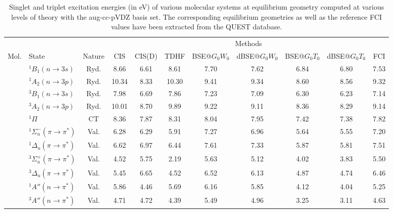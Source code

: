 \documentclass[aip,jcp,reprint,noshowkeys,superscriptaddress]{revtex4-1}
\newcommand{\mc}{\multicolumn}
\newcommand{\pps}{\pi \to \pi^*}
\newcommand{\nps}{n \to \pi^*}
\begin{document}
\begin{table}
	\caption{Singlet and triplet excitation energies (in \si{\eV}) of various molecular systems at equilibrium geometry computed at various levels of theory with the aug-cc-pVDZ basis set.
	The corresponding equilibrium geometries as well as the reference FCI values have been extracted from the QUEST database. \cite{Veril_2021}}
	\label{tab:mol}
	\begin{ruledtabular}
		\begin{tabular}{llccccccccc}
					&			&		&	\mc{8}{c}{Methods}																\\
			\cline{4-11}
			Mol.	&	State	&	Nature						&	CIS		&	CIS(D)	&	TDHF	&	BSE@$G_0W_0$	&	dBSE@$G_0W_0$	&	BSE@$G_0T_0$	&	dBSE@$G_0T_0$	&	FCI	\\
			\hline
			\ce{H2O}	&	$^1B_1(n \to 3s)$		&	Ryd.	&	8.66	&	6.61	&	8.61	&	7.70	&	7.62	&	6.84	&	6.80	&	7.53\\
						&	$^1A_2(n \to 3p)$		&	Ryd.	&	10.34	&	8.33	&	10.30	&	9.41	&	9.34	&	8.60	&	8.56	&	9.32\\
						&	$^3B_1(n \to 3s)$		&	Ryd.	&	7.98	&	6.69	&	7.86	&	7.23	&	7.09	&	6.30	&	6.23	&	7.14\\
						&	$^3A_2(n \to 3p)$		&	Ryd.	&	10.01	&	8.70	&	9.89	&	9.22	&	9.11	&	8.36	&	8.29	&	9.14\\
			\ce{HCl}	&	$^1\Pi$					&	CT		&	8.36	&	7.87	&	8.31	&	8.04	&	7.95	&	7.42	&	7.38	&	7.82\\
			\ce{HC#CH}	&	$^1\Sigma_u^-(\pps)$	&	Val.	&	6.28	&	6.29	&	5.91	&	7.27	&	6.96	&	5.64	&	5.55	&	7.20\\
						&	$^1\Delta_u(\pps)$		&	Val.	&	6.62	&	6.97	&	6.44	&	7.61	&	7.33	&	5.87	&	5.81	&	7.51\\
						&	$^3\Sigma_u^+(\pps)$	&	Val.	&	4.52	&	5.75	&	2.19	&	5.63	&	5.12	&	4.02	&	3.83	&	5.50\\
						&	$^3\Delta_u(\pps)$		&	Val.	&	5.45	&	6.65	&	4.52	&	6.52	&	6.13	&	4.87	&	4.74	&	6.46\\
			\ce{H2C=NH}	&	$^1A''(\nps)$			&	Val.	&	5.86	&	4.46	&	5.69	&	6.16	&	5.85	&	4.12	&	4.04	&	5.25\\
						&	$^3A''(\nps)$			&	Val.	&	4.71	&	4.72	&	4.39	&	5.49	&	4.96	&	3.25	&	3.11	&	4.63\\
		\end{tabular}
	\end{ruledtabular}
\end{table}

\end{document}
